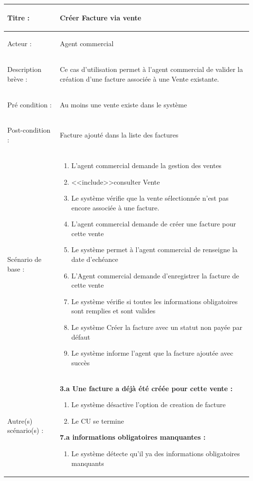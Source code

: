 \begin{longtable}{|>{\bfseries\raggedright\arraybackslash}p{3.5cm}|p{\dimexpr\textwidth-3.5cm-4\tabcolsep-2\arrayrulewidth}|}
\hline
Titre : & Créer Facture via vente \\
\hline
Acteur : & Agent commercial \\
\hline
Description brève : & Ce cas d'utilisation permet à l'agent commercial de valider la création d'une facture associée à une Vente existante. \\
\hline
Pré condition : & Au moins une vente existe dans le système \\
\hline
Post-condition : & Facture ajouté dans la liste des factures \\
\hline
Scénario de base : &
\begin{enumerate}[leftmargin=1.5em, topsep=2pt, itemsep=1pt]
  \item L'agent commercial demande la gestion des ventes
  \item <<include>>consulter Vente
  \item Le système vérifie que la vente sélectionnée n'est pas encore associée à une facture.
  \item L'agent commercial demande de créer une facture pour cette vente
  \item Le système permet à l'agent commercial de renseigne la date d'echéance
  \item L'Agent commercial demande d'enregistrer la facture de cette vente
  \item Le système vérifie si toutes les informations obligatoires sont remplies et sont valides
  \item Le système Créer la facture avec un statut non payée par défaut
  \item Le système informe l'agent que la facture ajoutée avec succès
\end{enumerate} \\
\hline
Autre(s) scénario(s) : &
\textbf{3.a Une facture a déjà été créée pour cette vente :}
\begin{enumerate}[leftmargin=1.5em, topsep=2pt, itemsep=1pt]
  \item Le système désactive l'option de creation de facture
  \item Le CU se termine
\end{enumerate}
\textbf{7.a informations obligatoires manquantes :}
\begin{enumerate}[leftmargin=1.5em, topsep=2pt, itemsep=1pt]
  \item Le système détecte qu'il ya des informations obligatoires manquants

\end{enumerate}
\end{longtable}
